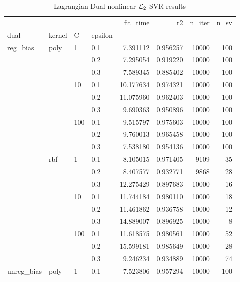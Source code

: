 \begin{table}[H]
\centering
\caption{Lagrangian Dual nonlinear $\protect \mathcal{L}_2$-SVR results}
\label{nonlinear_lagrangian_dual_l2_svr_cv_results}
\begin{tabular}{llllrrrr}
\toprule
           &     &     &     &   fit\_time &        r2 &  n\_iter &  n\_sv \\
dual & kernel & C & epsilon &            &           &         &       \\
\midrule
reg\_bias & poly & 1   & 0.1 &   7.391112 &  0.956257 &   10000 &   100 \\
           &     &     & 0.2 &   7.295054 &  0.919220 &   10000 &   100 \\
           &     &     & 0.3 &   7.589345 &  0.885402 &   10000 &   100 \\
           &     & 10  & 0.1 &  10.177634 &  0.974321 &   10000 &   100 \\
           &     &     & 0.2 &  11.075960 &  0.962403 &   10000 &   100 \\
           &     &     & 0.3 &   9.690363 &  0.950896 &   10000 &   100 \\
           &     & 100 & 0.1 &   9.515797 &  0.975603 &   10000 &   100 \\
           &     &     & 0.2 &   9.760013 &  0.965458 &   10000 &   100 \\
           &     &     & 0.3 &   7.538180 &  0.954136 &   10000 &   100 \\
           & rbf & 1   & 0.1 &   8.105015 &  0.971405 &    9109 &    35 \\
           &     &     & 0.2 &   8.407577 &  0.932771 &    9868 &    28 \\
           &     &     & 0.3 &  12.275429 &  0.897683 &   10000 &    16 \\
           &     & 10  & 0.1 &  11.744184 &  0.980110 &   10000 &    18 \\
           &     &     & 0.2 &  11.461862 &  0.936758 &   10000 &    12 \\
           &     &     & 0.3 &  14.889007 &  0.896925 &   10000 &     8 \\
           &     & 100 & 0.1 &  11.618575 &  0.980561 &   10000 &    52 \\
           &     &     & 0.2 &  15.599181 &  0.985649 &   10000 &    28 \\
           &     &     & 0.3 &   9.246234 &  0.934889 &   10000 &    74 \\
unreg\_bias & poly & 1   & 0.1 &   7.523806 &  0.957294 &   10000 &   100 \\

\end{tabular}
\end{table}
